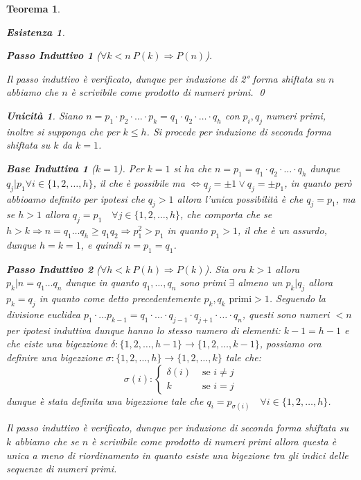 \documentclass{article}
\makeatletter
\renewenvironment{proof}[1][\proofname]{\par
    \pushQED{\qed}%
    \normalfont \topsep6\p@\@plus6\p@\relax
    \trivlist
    \item\relax
    {\itshape
    #1\@addpunct{.}}\hspace\labelsep\ignorespaces
    }{%
    \popQED\endtrivlist\@endpefalse
}
\newtheorem{theorem}{Teorema}[part]
\theoremstyle{definition}
\newtheorem*{existence}{Esistenza}
\newtheorem*{uniqueness}{Unicità}
\newtheorem*{base}{Base Induttiva}
\newtheorem*{step}{Passo Induttivo}
\makeatother
\begin{document}
\begin{theorem}
\begin{proof}
\begin{existence}
\begin{step}[$\forall k<n\ P(k)\Rightarrow P(n)$]
\begin{itemize}
                \end{itemize}
            \end{step}
            Il passo induttivo è verificato, dunque per induzione di 2° forma shiftata su \(n\) abbiamo che \(n\) è scrivibile come prodotto di numeri primi.
            \qed
        \end{existence}
        \begin{uniqueness}
            Siano \(n=p_1\cdot p_2\cdot\ldots\cdot p_k=q_1\cdot q_2\cdot\ldots\cdot q_h\) con \(p_i,q_j\) numeri primi, inoltre si supponga che per \(k\leq h\). Si procede per induzione di seconda forma shiftata su \(k\) da \(k=1\).
            \begin{base}[$k=1$]
                Per \(k=1\) si ha che \(n=p_1=q_1\cdot q_2\cdot\ldots\cdot q_h\) dunque \(q_j|p_1\forall i\in \{1,2,\ldots,h\}\), il che è possibile ma \(\Leftrightarrow q_j=\pm 1\lor q_j=\pm p_1\), in quanto però abbioamo definito per ipotesi che \(q_j>1\) allora l'unica possibilità è che \(q_j=p_1\), ma se \(h>1\) allora \(q_j=p_1\quad \forall j\in\{1,2,\ldots,h\}\), che comporta che se \(h>k\Rightarrow n=q_1\ldots q_h\geq q_1q_2\Rightarrow p_1^2>p_1\) in quanto \(p_1>1\), il che è un assurdo, dunque \(h=k=1\), e quindi \(n=p_1=q_1\).
            \end{base}
            \begin{step}[\(\forall h<k\ P(h)\Rightarrow P(k)\)]
                Sia ora \(k>1\) allora \(p_k|n=q_1\ldots q_n\) dunque in quanto \(q_1,\dots,q_n\) sono primi \(\exists\) almeno un \(p_k|q_j\) allora \(p_k=q_j\) in quanto come detto precedentemente \(p_k,q_k\text{ primi}>1\). Seguendo la divisione euclidea \(p_1\cdot\ldots p_{k-1} = q_1\cdot\ldots\cdot q_{j-1}\cdot q_{j+1}\cdot\ldots\cdot q_n\), questi sono numeri \(<n\) per ipotesi induttiva dunque hanno lo stesso numero di elementi: \(k-1=h-1\) e che eiste una bigezzione \(\delta:\{1,2,\ldots,h-1\}\rightarrow\{1,2,\ldots,k-1\}\), possiamo ora definire una bigezzione \(\sigma:\{1,2,\ldots,h\}\rightarrow\{1,2,\ldots,k\}\) tale che:\[
                    \sigma(i):\begin{cases}
                        \delta(i)&\text{ se } i\neq j\\
                        k&\text{ se } i=j
                    \end{cases}
                \] 
                dunque è stata definita una bigezzione tale che \(q_i=p_{\sigma(i)}\quad \forall i\in\{1,2,\ldots,h\}\).
            \end{step}
        \end{uniqueness}
        Il passo induttivo è verificato, dunque per induzione di seconda forma shiftata su \(k\) abbiamo che se \(n\) è scrivibile come prodotto di numeri primi allora questa è unica a meno di riordinamento in quanto esiste una bigezione tra gli indici delle sequenze di numeri primi.
        {\raggedleft{\pushQED{\ensuremath{\blacksquare}}}}
    \end{proof}
\end{theorem}
\end{document}
